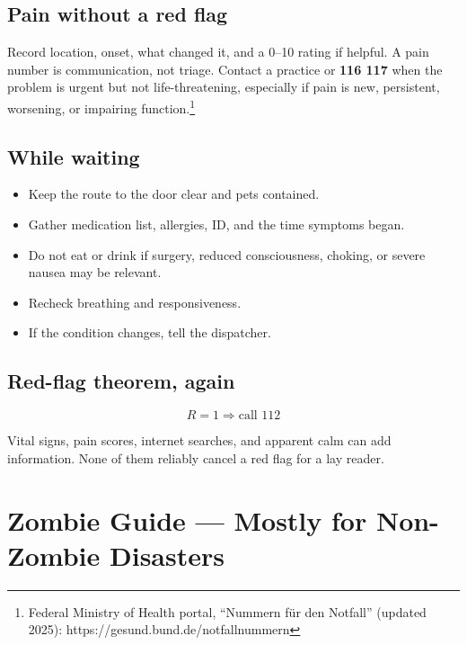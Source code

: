 \hypertarget{pain-without-a-red-flag}{%
\subsection{Pain without a red flag}\label{pain-without-a-red-flag}}

Record location, onset, what changed it, and a 0--10 rating if helpful.
A pain number is communication, not triage. Contact a practice or
\textbf{116 117} when the problem is urgent but not life-threatening,
especially if pain is new, persistent, worsening, or impairing
function.\footnote{Federal Ministry of Health portal, ``Nummern für den
  Notfall'' (updated 2025): https://gesund.bund.de/notfallnummern}

\hypertarget{while-waiting}{%
\subsection{While waiting}\label{while-waiting}}

\begin{itemize}
\tightlist
\item
  Keep the route to the door clear and pets contained.
\item
  Gather medication list, allergies, ID, and the time symptoms began.
\item
  Do not eat or drink if surgery, reduced consciousness, choking, or
  severe nausea may be relevant.
\item
  Recheck breathing and responsiveness.
\item
  If the condition changes, tell the dispatcher.
\end{itemize}

\hypertarget{red-flag-theorem-again}{%
\subsection{Red-flag theorem, again}\label{red-flag-theorem-again}}

\[R=1 \Rightarrow \text{call 112}\]

Vital signs, pain scores, internet searches, and apparent calm can add
information. None of them reliably cancel a red flag for a lay reader.

\hypertarget{06-zombie-guide}{}
\hypertarget{zombie-guide-mostly-for-non-zombie-disasters}{%
\section{Zombie Guide --- Mostly for Non-Zombie
Disasters}\label{zombie-guide-mostly-for-non-zombie-disasters}}

